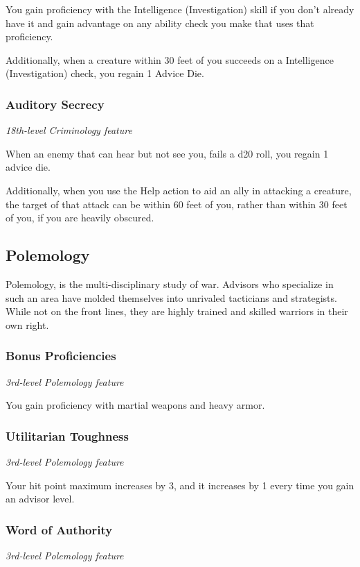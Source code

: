 \documentclass[letterpaper,openany,twoside,twocolumn]{book}
\begin{document}
	You gain proficiency with the Intelligence (Investigation) skill if you don't already have it and gain advantage on any ability check you make that uses that proficiency.
	
	Additionally, when a creature within 30 feet of you succeeds on a Intelligence (Investigation) check, you regain 1 Advice Die.
	
	\subsubsection*{Auditory Secrecy}
	\textnormal{\textit{18th-level Criminology feature}}
	
	When an enemy that can hear but not see you, fails a d20 roll, you regain 1 advice die.
	
	Additionally, when you use the Help action to aid an ally in attacking a creature, the target of that attack can be within 60 feet of you, rather than within 30 feet of you, if you are heavily obscured.
	\vfill\newpage
	\vspace*{-2.4\fontdimen6\font}
	\subsection*{Polemology}
	Polemology, is the multi-disciplinary study of war. Advisors who specialize in such an area have molded themselves into unrivaled tacticians and strategists. While not on the front lines, they are highly trained and skilled warriors in their own right.
	
	\subsubsection*{Bonus Proficiencies}
	\textnormal{\textit{3rd-level Polemology feature}}
	
	You gain proficiency with martial weapons and heavy armor.
	
	\subsubsection*{Utilitarian Toughness}
	\textnormal{\textit{3rd-level Polemology feature}}
	
	Your hit point maximum increases by 3, and it increases by 1 every time you gain an advisor level.
	
	\subsubsection*{Word of Authority}
	\textnormal{\textit{3rd-level Polemology feature}}
	
\end{document}

